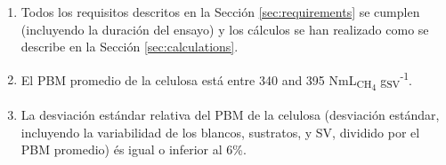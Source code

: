 \documentclass[]{article}
\begin{document}
\begin{enumerate}
  \item Todos los requisitos descritos en la Sección \ref{sec:requirements} se cumplen (incluyendo la duración del ensayo) y los cálculos se han realizado como se describe en la Sección \ref{sec:calculations}.
  \item El PBM promedio de la celulosa está entre 340 and 395 NmL\textsubscript{CH\textsubscript{4}} g\textsubscript{SV}\textsuperscript{-1}.
  \item La desviación estándar relativa del PBM de la celulosa (desviación estándar, incluyendo la variabilidad de los blancos, sustratos, y SV, dividido por el PBM promedio) és igual o inferior al 6\%.
\end{enumerate}


\end{document}
